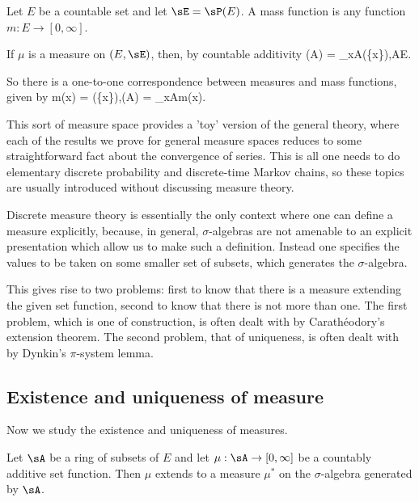 \begin{definition}
Let $E$ be a countable set and let $\sE=\sP(E)$. A mass function is any function $m:E\to [0,\infty]$.
\end{definition}

If $\mu$ is a measure on $(E,\sE)$, then, by countable additivity
\be
\mu(A) = \sum_{x\in A}\mu(\{x\}),\quad A\subseteq E.
\ee

So there is a one-to-one correspondence between measures and mass functions, given by
\be
m(x) = \mu(\{x\}),\quad\quad \mu(A) = \sum_{x\in A}m(x).
\ee

This sort of measure space provides a 'toy' version of the general theory, where each of the results we prove for general measure spaces reduces to some straightforward fact about the convergence of series. This is all one needs to do elementary discrete probability and discrete-time Markov chains, so these topics are usually introduced without discussing measure theory.

Discrete measure theory is essentially the only context where one can define a measure explicitly, because, in general, $\sigma$-algebras are not amenable to an explicit presentation which allow us to make such a definition. Instead one specifies the values to be taken on some smaller set of subsets, which generates the $\sigma$-algebra.

This gives rise to two problems: first to know that there is a measure extending the given set function, second to know that there is not more than one. The first problem, which is one of construction, is often dealt with by Carath\'eodory's extension theorem. The second problem, that of uniqueness, is often dealt with by Dynkin's $\pi$-system lemma.


\subsection{Existence and uniqueness of measure}

Now we study the existence and uniqueness of measures.

\begin{theorem}\label{thm:caratheodory_extension}
Let $\sA$ be a ring of subsets of $E$ and let $\mu:\sA\to[0,\infty]$ be a countably additive set function. Then $\mu$ extends to a measure $\mu^*$ on the $\sigma$-algebra generated by $\sA$.
\end{theorem}

